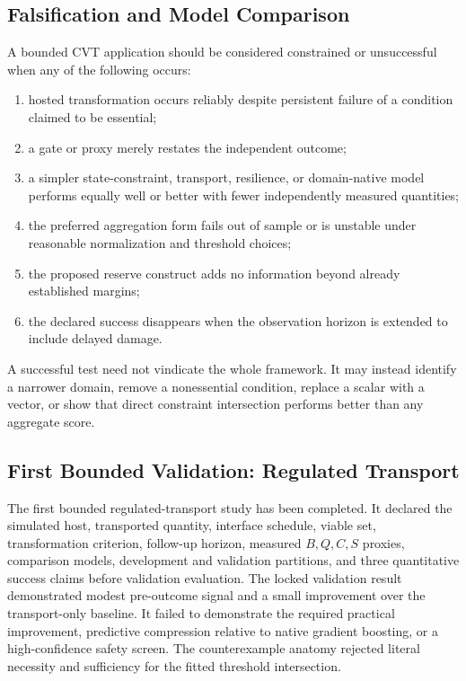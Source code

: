 \documentclass[11pt]{article}
\begin{document}
\subsection{Falsification and Model Comparison}

A bounded CVT application should be considered constrained or unsuccessful when any of the following occurs:
\begin{enumerate}[label=(\roman*)]
    \item hosted transformation occurs reliably despite persistent failure of a condition claimed to be essential;
    \item a gate or proxy merely restates the independent outcome;
    \item a simpler state-constraint, transport, resilience, or domain-native model performs equally well or better with fewer independently measured quantities;
    \item the preferred aggregation form fails out of sample or is unstable under reasonable normalization and threshold choices;
    \item the proposed reserve construct adds no information beyond already established margins;
    \item the declared success disappears when the observation horizon is extended to include delayed damage.
\end{enumerate}

A successful test need not vindicate the whole framework. It may instead identify a narrower domain, remove a nonessential condition, replace a scalar with a vector, or show that direct constraint intersection performs better than any aggregate score.

\subsection{First Bounded Validation: Regulated Transport}

The first bounded regulated-transport study has been completed. It declared the simulated host, transported quantity, interface schedule, viable set, transformation criterion, follow-up horizon, measured \(B,Q,C,S\) proxies, comparison models, development and validation partitions, and three quantitative success claims before validation evaluation. The locked validation result demonstrated modest pre-outcome signal and a small improvement over the transport-only baseline. It failed to demonstrate the required practical improvement, predictive compression relative to native gradient boosting, or a high-confidence safety screen. The counterexample anatomy rejected literal necessity and sufficiency for the fitted threshold intersection.
\end{document}
